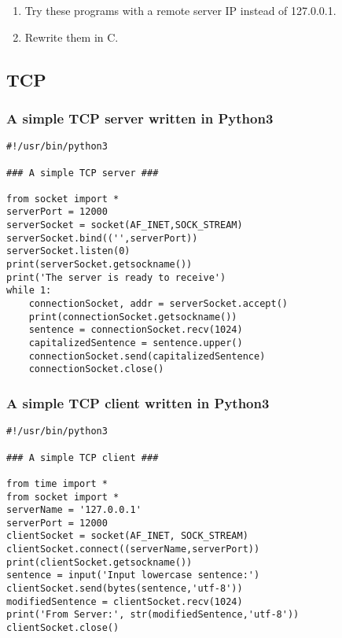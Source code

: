 \documentclass{article}
\begin{document}
\begin{enumerate}
\item Try these programs with a remote server IP instead of 127.0.0.1.
\item Rewrite them in C.
\end{enumerate}

\subsection{TCP}
\label{sec:org111600d}

\subsubsection{A simple TCP server written in Python3}
\label{sec:org5d09a7f}

\begin{verbatim}
#!/usr/bin/python3

### A simple TCP server ###

from socket import *
serverPort = 12000
serverSocket = socket(AF_INET,SOCK_STREAM)
serverSocket.bind(('',serverPort))
serverSocket.listen(0)
print(serverSocket.getsockname())
print('The server is ready to receive')
while 1:
    connectionSocket, addr = serverSocket.accept()
    print(connectionSocket.getsockname())
    sentence = connectionSocket.recv(1024)
    capitalizedSentence = sentence.upper()
    connectionSocket.send(capitalizedSentence)
    connectionSocket.close()
\end{verbatim}

\subsubsection{A simple TCP client written in Python3}
\label{sec:orgb17ff84}

\begin{verbatim}
#!/usr/bin/python3

### A simple TCP client ###

from time import *
from socket import *
serverName = '127.0.0.1'
serverPort = 12000
clientSocket = socket(AF_INET, SOCK_STREAM)
clientSocket.connect((serverName,serverPort))
print(clientSocket.getsockname())
sentence = input('Input lowercase sentence:')
clientSocket.send(bytes(sentence,'utf-8'))
modifiedSentence = clientSocket.recv(1024)
print('From Server:', str(modifiedSentence,'utf-8'))
clientSocket.close()
\end{verbatim}
\end{document}
